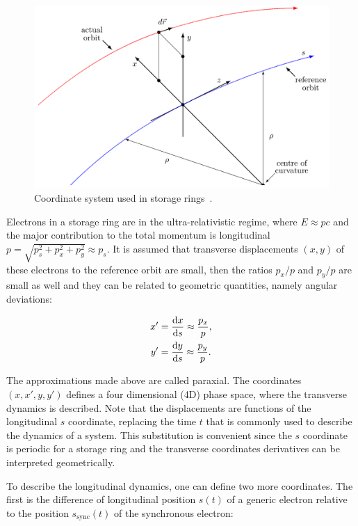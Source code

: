 \begin{figure}
    \centering
    \includegraphics[scale=0.25]{figures/reference_system.png}
    \caption{Coordinate system used in storage rings~\cite{madx}.}
    \label{syst}
\end{figure}

Electrons in a storage ring are in the ultra-relativistic regime, where $E \approx pc$ and the major contribution to the total momentum is longitudinal $p = \sqrt{p_s^2 + p_x^2 + p_y^2} \approx p_s$. It is assumed that transverse displacements $(x, y)$ of these electrons to the reference orbit are small, then the ratios $p_x/p$ and $p_y/p$ are small as well and they can be related to geometric quantities, namely angular deviations:

\begin{align*}
    x' &= \frac{\mathrm{d} x}{\mathrm{d} s} \approx \frac{p_x}{p}, \\
    y' &= \frac{\mathrm{d} y}{\mathrm{d} s} \approx \frac{p_y}{p}.
\end{align*}

The approximations made above are called paraxial. The coordinates $(x, x', y, y')$ defines a four dimensional (4D) phase space, where the transverse dynamics is described. Note that the displacements are functions of the longitudinal $s$ coordinate, replacing the time $t$ that is commonly used to describe the dynamics of a system. This substitution is convenient since the $s$ coordinate is periodic for a storage ring and the transverse coordinates derivatives can be interpreted geometrically.

To describe the longitudinal dynamics, one can define two more coordinates. The first is the difference of longitudinal position $s(t)$ of a generic electron relative to the position $s_{\mathrm{sync}}(t)$ of the synchronous electron:

